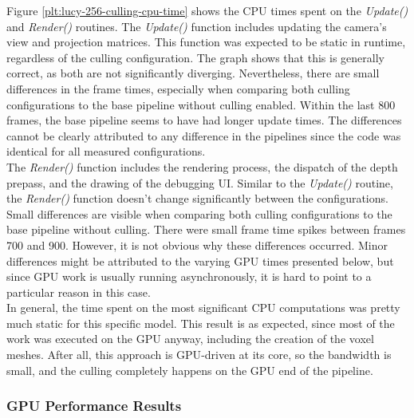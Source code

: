 \noindent
Figure \ref{plt:lucy-256-culling-cpu-time} shows the \ac{CPU} times spent on the \emph{Update()} and \emph{Render()}
routines. The \emph{Update()} function includes updating the camera's view and projection matrices. This function was 
expected to be static in runtime, regardless of the culling configuration. The graph shows that this is generally 
correct, as both are not significantly diverging. Nevertheless, there are small differences in the frame times, 
especially when comparing both culling configurations to the base pipeline without culling enabled. Within the last 
800 frames, the base pipeline seems to have had longer update times. The differences cannot be clearly attributed to 
any difference in the pipelines since the code was identical for all measured configurations. \\

\noindent
The \emph{Render()} function includes the rendering process, the dispatch of the depth prepass, and the drawing of the 
debugging \ac{UI}. Similar to the \emph{Update()} routine, the \emph{Render()} function doesn't change significantly 
between the configurations. Small differences are visible when comparing both culling configurations to the base 
pipeline without culling. There were small frame time spikes between frames 700 and 900. However, it is not obvious 
why these differences occurred. Minor differences might be attributed to the varying \ac{GPU} times presented below, 
but since \ac{GPU} work is usually running asynchronously, it is hard to point to a particular reason in this case. \\

\noindent
In general, the time spent on the most significant \ac{CPU} computations was pretty much static for this specific 
model. This result is as expected, since most of the work was executed on the \ac{GPU} anyway, including the creation 
of the voxel meshes. After all, this approach is \ac{GPU}-driven at its core, so the bandwidth is small, and the culling 
completely happens on the \ac{GPU} end of the pipeline.

\subsubsection*{GPU Performance Results} \label{subsubsec-gpu-performance-results-lucy}

